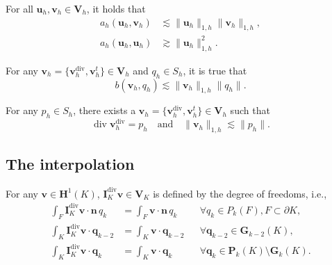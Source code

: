 \documentclass[review,hidelinks,onefignum,onetabnum]{siamart251216}
\begin{document}
\begin{lemma}\label{lem:10}
For all \(\boldsymbol{u}_h, \boldsymbol{v}_h \in \boldsymbol{V}_h\), it holds that
\begin{align*}
a_h(\boldsymbol{u}_h, \boldsymbol{v}_h) &\lesssim \|\boldsymbol{u}_h\|_{1,h} \|\boldsymbol{v}_h\|_{1,h}, \\
a_h(\boldsymbol{u}_h, \boldsymbol{u}_h) &\gtrsim  \|\boldsymbol{u}_h\|_{1,h}^2.
\end{align*}
\end{lemma}




\begin{lemma}\label{lem:11}
For any \(\boldsymbol{v}_h = \{\boldsymbol{v}_h^{\operatorname{div}}, \boldsymbol{v}_h^t\} \in \boldsymbol{V}_h\) and \(q_h \in S_h\), it is true that
\[
b(\boldsymbol{v}_h, q_h) \lesssim \|\boldsymbol{v}_h\|_{1,h} \|q_h\|.
\]
\end{lemma}

\begin{lemma}\label{lem:12}
For any \(p_h \in S_h\), there exists a \(\boldsymbol{v}_h = \{\boldsymbol{v}_h^{\operatorname{div}}, \boldsymbol{v}_h^t\} \in \boldsymbol{V}_h\) such that
\[
\operatorname{div} \boldsymbol{v}_h^{\operatorname{div}} = p_h \quad \text{and} \quad \|\boldsymbol{v}_h\|_{1,h} \lesssim \|p_h\|.
\]
\end{lemma}

\subsection{The interpolation}
For any \(\boldsymbol{v} \in \boldsymbol{H}^1(K)\), \(\boldsymbol{I}_K^{\operatorname{div}} \boldsymbol{v} \in \boldsymbol{V}_K\) is defined by the degree of freedoms, i.e.,
\begin{align*}
\int_F \boldsymbol{I}_K^{\operatorname{div}} \boldsymbol{v} \cdot \boldsymbol{n} \, q_k &= \int_F \boldsymbol{v} \cdot \boldsymbol{n} \, q_k && \forall q_k \in P_k(F), F \subset \partial K, \\
\int_K \boldsymbol{I}_K^{\operatorname{div}} \boldsymbol{v} \cdot \boldsymbol{q}_{k-2} &= \int_K \boldsymbol{v} \cdot \boldsymbol{q}_{k-2} && \forall \boldsymbol{q}_{k-2} \in \boldsymbol{G}_{k-2}(K), \\
\int_K \boldsymbol{I}_K^{\operatorname{div}} \boldsymbol{v} \cdot \boldsymbol{q}_k &= \int_K \boldsymbol{v} \cdot \boldsymbol{q}_k && \forall \boldsymbol{q}_k \in \boldsymbol{P}_k(K) \setminus \boldsymbol{G}_k(K).
\end{align*}
\end{document}
